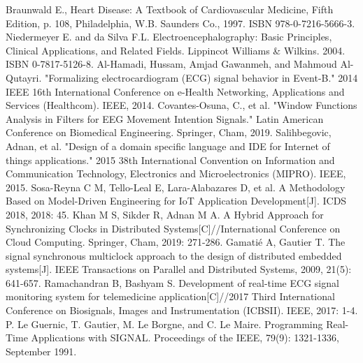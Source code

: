 \documentclass{article}
\begin{document}
\begin{thebibliography}{99}  
 Braunwald E., Heart Disease: A Textbook of Cardiovascular Medicine, Fifth Edition, p. 108, Philadelphia, W.B. Saunders Co., 1997. ISBN 978-0-7216-5666-3.
 Niedermeyer E. and da Silva F.L. Electroencephalography: Basic Principles, Clinical Applications, and Related Fields. Lippincot Williams & Wilkins. 2004. ISBN 0-7817-5126-8.
 Al-Hamadi, Hussam, Amjad Gawanmeh, and Mahmoud Al-Qutayri. "Formalizing electrocardiogram (ECG) signal behavior in Event-B." 2014 IEEE 16th International Conference on e-Health Networking, Applications and Services (Healthcom). IEEE, 2014.
 Covantes-Osuna, C., et al. "Window Functions Analysis in Filters for EEG Movement Intention Signals." Latin American Conference on Biomedical Engineering. Springer, Cham, 2019.
 Salihbegovic, Adnan, et al. "Design of a domain specific language and IDE for Internet of things applications." 2015 38th International Convention on Information and Communication Technology, Electronics and Microelectronics (MIPRO). IEEE, 2015.
 Sosa-Reyna C M, Tello-Leal E, Lara-Alabazares D, et al. A Methodology Based on Model-Driven Engineering for IoT Application Development[J]. ICDS 2018, 2018: 45.
 Khan M S, Sikder R, Adnan M A. A Hybrid Approach for Synchronizing Clocks in Distributed Systems[C]//International Conference on Cloud Computing. Springer, Cham, 2019: 271-286.
 Gamatié A, Gautier T. The signal synchronous multiclock approach to the design of distributed embedded systems[J]. IEEE Transactions on Parallel and Distributed Systems, 2009, 21(5): 641-657.
 Ramachandran B, Bashyam S. Development of real-time ECG signal monitoring system for telemedicine application[C]//2017 Third International Conference on Biosignals, Images and Instrumentation (ICBSII). IEEE, 2017: 1-4.
 P. Le Guernic, T. Gautier, M. Le Borgne, and C. Le Maire. Programming Real-Time Applications with SIGNAL. Proceedings of the IEEE, 79(9): 1321-1336, September 1991.
\end{thebibliography}
\end{document}
